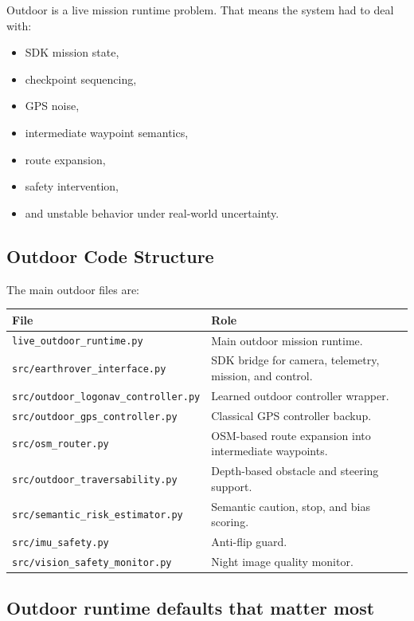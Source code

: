 \documentclass[11pt]{article}
\begin{document}
Outdoor is a live mission runtime problem. That means the system had to deal with:

\begin{itemize}[nosep]
  \item SDK mission state,
  \item checkpoint sequencing,
  \item GPS noise,
  \item intermediate waypoint semantics,
  \item route expansion,
  \item safety intervention,
  \item and unstable behavior under real-world uncertainty.
\end{itemize}

\subsection{Outdoor Code Structure}

The main outdoor files are:

\begin{longtable}{p{}p{}}
\toprule
\textbf{File} & \textbf{Role} \\
\midrule
\texttt{live\_outdoor\_runtime.py} & Main outdoor mission runtime. \\
\texttt{src/earthrover\_interface.py} & SDK bridge for camera, telemetry, mission, and control. \\
\texttt{src/outdoor\_logonav\_controller.py} & Learned outdoor controller wrapper. \\
\texttt{src/outdoor\_gps\_controller.py} & Classical GPS controller backup. \\
\texttt{src/osm\_router.py} & OSM-based route expansion into intermediate waypoints. \\
\texttt{src/outdoor\_traversability.py} & Depth-based obstacle and steering support. \\
\texttt{src/semantic\_risk\_estimator.py} & Semantic caution, stop, and bias scoring. \\
\texttt{src/imu\_safety.py} & Anti-flip guard. \\
\texttt{src/vision\_safety\_monitor.py} & Night image quality monitor. \\
\bottomrule
\end{longtable}

\subsection{Outdoor runtime defaults that matter most}
\end{document}
